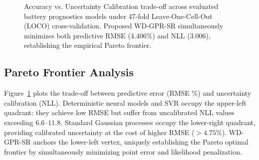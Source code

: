 \documentclass[a4paper,fleqn]{cas-sc}
\begin{document}
\begin{figure}[pos=htbp]
\caption{Accuracy vs. Uncertainty Calibration trade-off across evaluated battery prognostics models under 47-fold Leave-One-Cell-Out (LOCO) cross-validation. Proposed WD-GPR-SR simultaneously minimizes both predictive RMSE ($4.406\%$) and NLL ($3.006$), establishing the empirical Pareto frontier.}
\label{fig:pareto_frontier}
\end{figure}

\subsection{Pareto Frontier Analysis}
Figure~\ref{fig:pareto_frontier} plots the trade-off between predictive error (RMSE \%) and uncertainty calibration (NLL). Deterministic neural models and SVR occupy the upper-left quadrant: they achieve low RMSE but suffer from uncalibrated NLL values exceeding $6.6$--$11.8$. Standard Gaussian processes occupy the lower-right quadrant, providing calibrated uncertainty at the cost of higher RMSE ($>4.75\%$). WD-GPR-SR anchors the lower-left vertex, uniquely establishing the Pareto optimal frontier by simultaneously minimizing point error and likelihood penalization.
\end{document}

